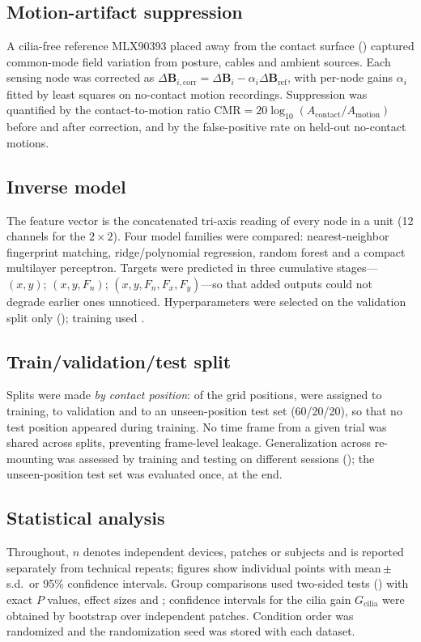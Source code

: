 \subsection*{Motion-artifact suppression}
A cilia-free reference MLX90393 placed away from the contact surface
() captured common-mode field variation from posture,
cables and ambient sources. Each sensing node was corrected as
$\Delta\mathbf{B}_{i,\mathrm{corr}}=\Delta\mathbf{B}_i-\alpha_i
\Delta\mathbf{B}_{\mathrm{ref}}$, with per-node gains $\alpha_i$ fitted by
least squares on no-contact motion recordings. Suppression was quantified by
the contact-to-motion ratio $\mathrm{CMR}=20\log_{10}(A_{\mathrm{contact}}/
A_{\mathrm{motion}})$ before and after correction, and by the false-positive
rate on held-out no-contact motions.

\subsection*{Inverse model}
The feature vector is the concatenated tri-axis reading of every node in a
unit (12 channels for the $2\times2$). Four model families were compared:
nearest-neighbor fingerprint matching, ridge/polynomial regression, random
forest and a compact multilayer perceptron. Targets were predicted in three
cumulative stages---$(x,y)$; $(x,y,F_n)$; $(x,y,F_n,F_x,F_y)$---so that
added outputs could not degrade earlier ones unnoticed. Hyperparameters were
selected on the validation split only (); training used .

\subsection*{Train/validation/test split}
Splits were made \emph{by contact position}: of the grid positions,
 were assigned to training,  to validation and
 to an unseen-position test set (60/20/20), so that no test
position appeared during training. No time frame from a given trial was
shared across splits, preventing frame-level leakage. Generalization across
re-mounting was assessed by training and testing on different sessions
(); the unseen-position test set was
evaluated once, at the end.

\subsection*{Statistical analysis}
Throughout, $n$ denotes independent devices, patches or subjects and is
reported separately from technical repeats; figures show individual points
with mean\,$\pm$\,s.d.\ or 95\% confidence intervals. Group comparisons used
two-sided tests ()
with exact $P$ values, effect sizes and ; confidence intervals for the cilia gain $G_{\mathrm{cilia}}$
were obtained by bootstrap over independent patches. Condition order was
randomized and the randomization seed was stored with each dataset.

